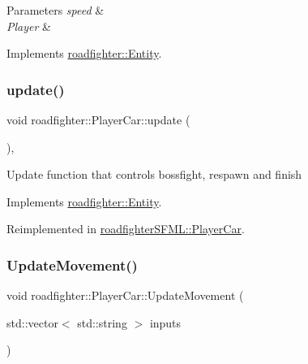 \begin{DoxyParams}{Parameters}
{\em speed} & \\
\hline
{\em Player} & \\
\hline
\end{DoxyParams}


Implements \hyperlink{classroadfighter_1_1Entity_a611ba56595dd2137d308876ba820cc09}{roadfighter\+::\+Entity}.

\mbox{\label{classroadfighter_1_1PlayerCar_a47772fa1d9fcdba69f288112d5359acd}} 
\subsubsection{\texorpdfstring{update()}{update()}\hspace{0.1cm}{\footnotesize\ttfamily [2/2]}}
{\footnotesize\ttfamily void roadfighter\+::\+Player\+Car\+::update (\begin{DoxyParamCaption}{ }\end{DoxyParamCaption})\hspace{0.3cm}{\ttfamily [override]}, {\ttfamily [virtual]}}

Update function that controls bossfight, respawn and finish 

Implements \hyperlink{classroadfighter_1_1Entity_a19cd353f12a3e8432acd6d5609137561}{roadfighter\+::\+Entity}.



Reimplemented in \hyperlink{classroadfighterSFML_1_1PlayerCar_a1fb9b80b068e689bef90cad28c53869c}{roadfighter\+S\+F\+M\+L\+::\+Player\+Car}.

\mbox{\label{classroadfighter_1_1PlayerCar_a2aa6cf43ac6cf7834d1f854d33fc5e0d}} 
\subsubsection{\texorpdfstring{Update\+Movement()}{UpdateMovement()}}
{\footnotesize\ttfamily void roadfighter\+::\+Player\+Car\+::\+Update\+Movement (\begin{DoxyParamCaption}\item[{std\+::vector$<$ std\+::string $>$}]{inputs }\end{DoxyParamCaption})\hspace{0.3cm}{\ttfamily [protected]}}

